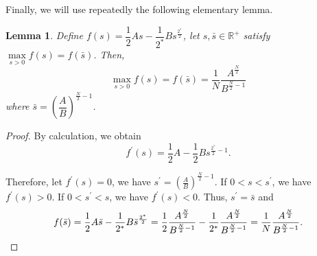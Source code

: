 \documentclass[10pt]{article}
\newtheorem{lemma}[proposition]{Lemma}
\theoremstyle{definition}
\numberwithin{equation}{section}
\begin{document}
Finally, we will use repeatedly the following elementary lemma. 
%
\begin{lemma}\label{fmax}Define $f(s)=\dfrac{1}{2}As-\dfrac{1}{2^{*}}Bs^{\frac{2^{*}}{2}}$, let $s,\bar{s}\in \mathbb{R}^{+}$ satisfy $\max\limits_{s>0}f(s)=f(\bar{s})$. Then,
\[\max\limits_{s>0}f(s)=f(\bar{s})= \frac{1}{N}\frac{A^{\frac{N}{2}}}{B^{\frac{N}{2}-1}}\]
where $\bar{s}=\left(\dfrac{A}{B}\right)^{\frac{N}{2}-1}$.
\end{lemma}
\begin{proof}
By calculation, we obtain
\[f^{\prime}(s)= \frac{1}{2}A-\frac{1}{2}Bs^{\frac{2^{*}}{2}-1}.\]

Therefore, let $f^{\prime}(s)=0$, we have $s^{\prime}=(\frac{A}{B})^{\frac{N}{2}-1}$. If $0<s<s^{\prime}$, we have $f^{\prime}(s)>0$. If $0<s^{\prime}<s$, we have $f^{\prime}(s)<0$. Thus, $s^{\prime}=\bar{s}$ and
\begin{equation*}
f(\bar{s})=\frac{1}{2}A\bar{s}-\frac{1}{2^{*}}B\bar{s}^{\frac{2^{*}}{2}}= \frac{1}{2}\frac{A^{\frac{N}{2}}}{B^{\frac{N}{2}-1}}-\frac{1}{2^{*}}\frac{A^{\frac{N}{2}}}{B^{\frac{N}{2}-1}}
= \frac{1}{N}\frac{A^{\frac{N}{2}}}{B^{\frac{N}{2}-1}}. \qedhere
\end{equation*}
\end{proof}
\end{document}
